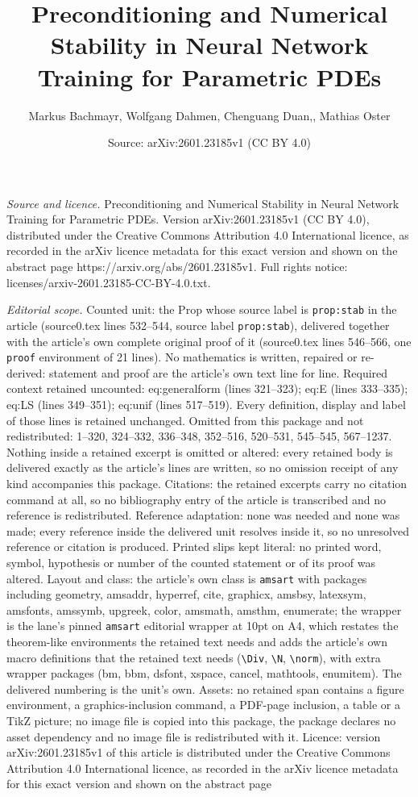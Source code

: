 \documentclass[10pt,a4paper]{amsart}
\title[Preconditioning and Numerical Stability in Neural Network Tr]{Preconditioning and Numerical Stability in Neural Network Training for Parametric PDEs}
\author{Markus Bachmayr, Wolfgang Dahmen, Chenguang Duan,, Mathias Oster}
\date{Source: arXiv:2601.23185v1 (CC BY 4.0)}
\begin{document}
\maketitle

\noindent\emph{Source and licence.} Preconditioning and Numerical Stability in Neural Network Training for Parametric PDEs. Version arXiv:2601.23185v1 (CC BY 4.0), distributed under the Creative Commons Attribution 4.0 International licence, as recorded in the arXiv licence metadata for this exact version and shown on the abstract page https://arxiv.org/abs/2601.23185v1. Full rights notice: licenses/arxiv-2601.23185-CC-BY-4.0.txt.\par\smallskip

\noindent\textit{Editorial scope.} Counted unit: the Prop whose source label is \texttt{prop:stab} in the article (source0.tex lines 532--544, source label \texttt{prop:stab}), delivered together with the article's own complete original proof of it (source0.tex lines 546--566, one \texttt{proof} environment of 21 lines). No mathematics is written, repaired or re-derived: statement and proof are the article's own text line for line. Required context retained uncounted: eq:generalform (lines 321--323); eq:E (lines 333--335); eq:LS (lines 349--351); eq:unif (lines 517--519). Every definition, display and label of those lines is retained unchanged. Omitted from this package and not redistributed: 1--320, 324--332, 336--348, 352--516, 520--531, 545--545, 567--1237. Nothing inside a retained excerpt is omitted or altered: every retained body is delivered exactly as the article's lines are written, so no omission receipt of any kind accompanies this package. Citations: the retained excerpts carry no citation command at all, so no bibliography entry of the article is transcribed and no reference is redistributed. Reference adaptation: none was needed and none was made; every reference inside the delivered unit resolves inside it, so no unresolved reference or citation is produced. Printed slips kept literal: no printed word, symbol, hypothesis or number of the counted statement or of its proof was altered. Layout and class: the article's own class is \texttt{amsart} with packages including geometry, amsaddr, hyperref, cite, graphicx, amsbsy, latexsym, amsfonts, amssymb, upgreek, color, amsmath, amsthm, enumerate; the wrapper is the lane's pinned \texttt{amsart} editorial wrapper at 10pt on A4, which restates the theorem-like environments the retained text needs and adds the article's own macro definitions that the retained text needs (\texttt{\textbackslash Div}, \texttt{\textbackslash N}, \texttt{\textbackslash norm}), with extra wrapper packages (bm, bbm, dsfont, xspace, cancel, mathtools, enumitem). The delivered numbering is the unit's own. Assets: no retained span contains a figure environment, a graphics-inclusion command, a PDF-page inclusion, a table or a TikZ picture; no image file is copied into this package, the package declares no asset dependency and no image file is redistributed with it. Licence: version arXiv:2601.23185v1 of this article is distributed under the Creative Commons Attribution 4.0 International licence, as recorded in the arXiv licence metadata for this exact version and shown on the abstract page 
\end{document}
